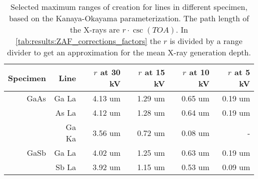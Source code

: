 \begin{table}[htbp]
    \begin{center}
        \caption{
            Selected maximum ranges of creation for lines in different specimen, based on the Kanaya-Okayama parameterization.
            The path length of the X-rays are $r \cdot \csc(TOA)$.
            In \cref{tab:results:ZAF_corrections_factors} the $r$ is divided by a range divider to get an approximation for the mean X-ray generation depth.
        }
        \label{tab:results:ZAF_corrections_range_r}
        \begin{tabular}{rrrrrr}
            \hline
            \textbf{Specimen} & \textbf{Line} & \textbf{$r$ at 30 kV} & \textbf{$r$ at 15 kV} & \textbf{$r$ at 10 kV} & \textbf{$r$ at 5 kV} \\
            \hline
            GaAs              & Ga La         & 4.13 um               & 1.29 um               & 0.65 um               & 0.19 um              \\
                              & As La         & 4.12 um               & 1.28 um               & 0.64 um               & 0.19 um              \\
                              & Ga Ka         & 3.56 um               & 0.72 um               & 0.08 um               & -                    \\
            \hline
            GaSb              & Ga La         & 4.02 um               & 1.25 um               & 0.63 um               & 0.19 um              \\
                              & Sb La         & 3.92 um               & 1.15 um               & 0.53 um               & 0.09 um              \\
            \hline
        \end{tabular}
    \end{center}
\end{table}
